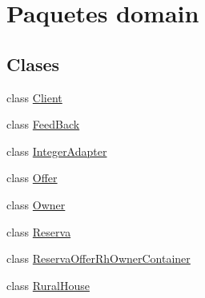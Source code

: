 \hypertarget{namespacedomain}{}\section{Paquetes domain}
\label{namespacedomain}
\subsection*{Clases}
\begin{DoxyCompactItemize}
\item 
class \mbox{\hyperlink{classdomain_1_1_client}{Client}}
\item 
class \mbox{\hyperlink{classdomain_1_1_feed_back}{Feed\+Back}}
\item 
class \mbox{\hyperlink{classdomain_1_1_integer_adapter}{Integer\+Adapter}}
\item 
class \mbox{\hyperlink{classdomain_1_1_offer}{Offer}}
\item 
class \mbox{\hyperlink{classdomain_1_1_owner}{Owner}}
\item 
class \mbox{\hyperlink{classdomain_1_1_reserva}{Reserva}}
\item 
class \mbox{\hyperlink{classdomain_1_1_reserva_offer_rh_owner_container}{Reserva\+Offer\+Rh\+Owner\+Container}}
\item 
class \mbox{\hyperlink{classdomain_1_1_rural_house}{Rural\+House}}
\end{DoxyCompactItemize}

